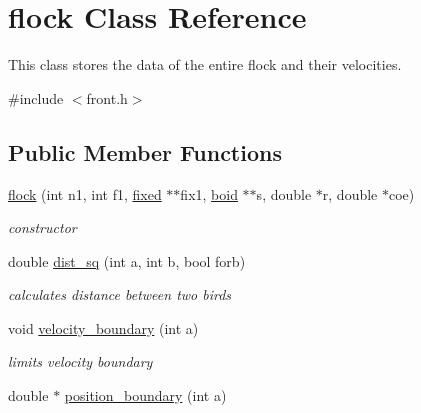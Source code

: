 \hypertarget{classflock}{}\section{flock Class Reference}
\label{classflock}


This class stores the data of the entire flock and their velocities.  




{\ttfamily \#include $<$front.\+h$>$}

\subsection*{Public Member Functions}
\begin{DoxyCompactItemize}
\item 
\mbox{\label{classflock_ab77e01c65a82c502063c372e0197857c}} 
\mbox{\hyperlink{classflock_ab77e01c65a82c502063c372e0197857c}{flock}} (int n1, int f1, \mbox{\hyperlink{classfixed}{fixed}} $\ast$$\ast$fix1, \mbox{\hyperlink{classboid}{boid}} $\ast$$\ast$s, double $\ast$r, double $\ast$coe)
\begin{DoxyCompactList}\small\item\em constructor \end{DoxyCompactList}\item 
\mbox{\label{classflock_a5f1f1d7bebf93312cfdae8e79acebd16}} 
double \mbox{\hyperlink{classflock_a5f1f1d7bebf93312cfdae8e79acebd16}{dist\+\_\+sq}} (int a, int b, bool forb)
\begin{DoxyCompactList}\small\item\em calculates distance between two birds \end{DoxyCompactList}\item 
\mbox{\label{classflock_ad8091787fa9dc3a5bb8fdbadc5992306}} 
void \mbox{\hyperlink{classflock_ad8091787fa9dc3a5bb8fdbadc5992306}{velocity\+\_\+boundary}} (int a)
\begin{DoxyCompactList}\small\item\em limits velocity boundary \end{DoxyCompactList}\item 
\mbox{\label{classflock_a994f36a53e35f7e5acb4951b5d3f5076}} 
double $\ast$ \mbox{\hyperlink{classflock_a994f36a53e35f7e5acb4951b5d3f5076}{position\+\_\+boundary}} (int a)

\end{DoxyCompactItemize}
